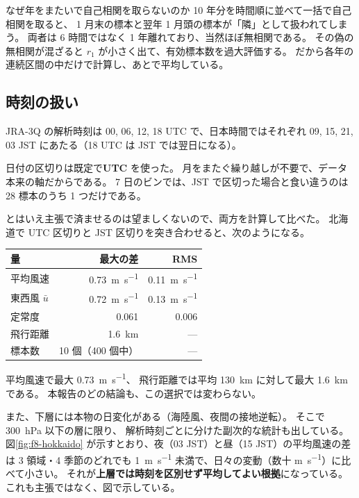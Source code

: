 \begin{whybox}{なぜ年をまたいで自己相関を取らないのか}
10 年分を時間順に並べて一括で自己相関を取ると、
1 月末の標本と翌年 1 月頭の標本が「隣」として扱われてしまう。
両者は 6 時間ではなく 1 年離れており、当然ほぼ無相関である。
その偽の無相関が混ざると $r_1$ が小さく出て、有効標本数を過大評価する。
だから各年の連続区間の中だけで計算し、あとで平均している。
\end{whybox}

\subsection{時刻の扱い}

JRA-3Q の解析時刻は 00, 06, 12, 18 UTC で、日本時間ではそれぞれ
09, 15, 21, 03 JST にあたる（18 UTC は JST では翌日になる）。

日付の区切りは既定で\textbf{UTC} を使った。
月をまたぐ繰り越しが不要で、データ本来の軸だからである。
7 日のビンでは、JST で区切った場合と食い違うのは 28 標本のうち 1 つだけである。

とはいえ主張で済ませるのは望ましくないので、両方を計算して比べた。
北海道で UTC 区切りと JST 区切りを突き合わせると、次のようになる。

\begin{center}
\begin{tabular}{lrr}
\toprule
量 & 最大の差 & RMS \\
\midrule
平均風速 & \SI{0.73}{\metre\per\second} & \SI{0.11}{\metre\per\second} \\
東西風 $\bar u$ & \SI{0.72}{\metre\per\second} & \SI{0.13}{\metre\per\second} \\
定常度 & 0.061 & 0.006 \\
飛行距離 & \SI{1.6}{\kilo\metre} & --- \\
標本数 & 10 個（400 個中） & --- \\
\bottomrule
\end{tabular}
\end{center}

平均風速で最大 \SI{0.73}{\metre\per\second}、
飛行距離では平均 \SI{130}{\kilo\metre} に対して最大 \SI{1.6}{\kilo\metre} である。
本報告のどの結論も、この選択では変わらない。

また、下層には本物の日変化がある（海陸風、夜間の接地逆転）。
そこで \SI{300}{\hecto\pascal} 以下の層に限り、
解析時刻ごとに分けた副次的な統計も出している。
図\ref{fig:f8-hokkaido} が示すとおり、夜（03 JST）と昼（15 JST）の平均風速の差は
3 領域・4 季節のどれでも \SI{1}{\metre\per\second} 未満で、日々の変動（数十 \si{\metre\per\second}）に比べて小さい。
それが\textbf{上層では時刻を区別せず平均してよい根拠}になっている。
これも主張ではなく、図で示している。

